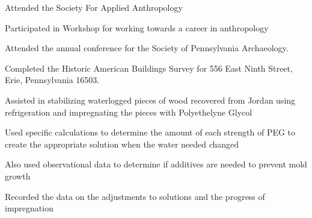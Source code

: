 \documentclass[letterpaper]{resume}
\begin{document}
\begin{compactitem}
\item Attended the Society For Applied Anthropology
\item Participated in Workshop for working towards a career in anthropology
\end{compactitem}

\begin{compactitem}
\item Attended the annual conference for the Society of Pennsylvania Archaeology.
\end{compactitem}

\begin{compactitem}
\item Completed the Historic American Buildings Survey for 556 East Ninth Street, Erie, Pennsylvania 16503.
\end{compactitem}


\begin{compactitem}
\item Assisted in stabilizing waterlogged pieces of wood recovered from Jordan using refrigeration and impregnating the pieces with Polyethelyne Glycol
\item Used specific calculations to determine the amount of each strength of PEG to create the appropriate solution when the water needed changed
\item Also used observational data to determine if additives are needed to prevent mold growth
\item Recorded the data on the adjustments to solutions and the progress of impregnation
\end{compactitem}
\end{document}
